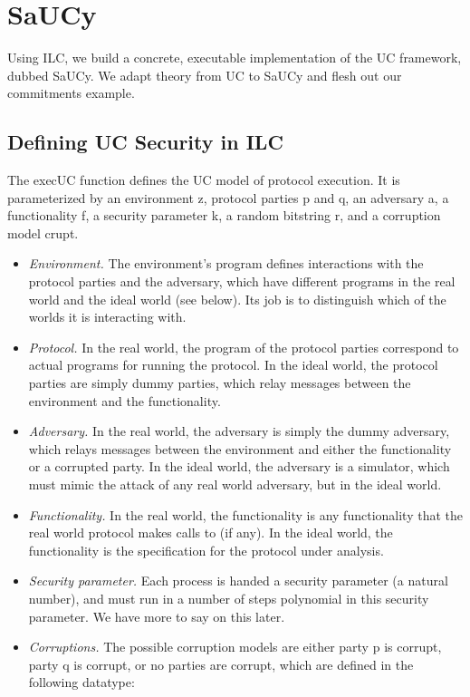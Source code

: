\section{SaUCy}
\label{sec:saucy}

Using ILC, we build a concrete, executable implementation of the UC framework,
dubbed SaUCy. We adapt theory from UC to SaUCy and flesh out our commitments
example.

\subsection{Defining UC Security in ILC}
\label{subsec:saucy}
\label{subsec:uc}
The \textsf{execUC} function defines the UC model of protocol execution. It is
parameterized by an environment \textsf{z}, protocol parties \textsf{p} and
\textsf{q}, an adversary \textsf{a}, a functionality \textsf{f}, a security
parameter \textsf{k}, a random bitstring \textsf{r}, and a corruption model
\textsf{crupt}.

\begin{itemize}[leftmargin=*]
  \item \emph{Environment.} The environment's program defines interactions with
    the protocol parties and the adversary, which have different programs in the
    real world and the ideal world (see below). Its job is to distinguish which
    of the worlds it is interacting with.
  \item \emph{Protocol.} In the real world, the program of the protocol parties
    correspond to actual programs for running the protocol. In the ideal world,
    the protocol parties are simply dummy parties, which relay messages between
    the environment and the functionality.
  \item \emph{Adversary.} In the real world, the adversary is simply the dummy
    adversary, which relays messages between the environment and either the
    functionality or a corrupted party. In the ideal world, the adversary is a
    simulator, which must mimic the attack of any real world adversary, but in
    the ideal world.
  \item \emph{Functionality.} In the real world, the functionality is any
    functionality that the real world protocol makes calls to (if any). In the
    ideal world, the functionality is the specification for the protocol under
    analysis.
  \item \emph{Security parameter.} Each process is handed a security parameter
    (a natural number), and must run in a number of steps polynomial in this
    security parameter. We have more to say on this later.
  \item \emph{Corruptions.} The possible corruption models are either party
    \textsf{p} is corrupt, party \textsf{q} is corrupt, or no parties are
    corrupt, which are defined in the following datatype:
    
\end{itemize}

